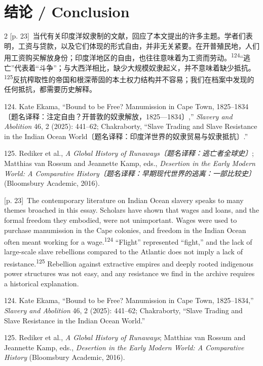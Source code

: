 \documentclass[10pt,a4paper]{article}
\begin{document}
\section*{结论 / Conclusion}
\begin{paracol}{2}
{\scriptsize\color{gray} [p. 23]}\ 当代有关印度洋奴隶制的文献，回应了本文提出的许多主题。学者们表明，工资与贷款，以及它们体现的形式自由，并非无关紧要。在开普殖民地，人们用工资购买解放身份；印度洋地区的自由，也往往意味着为工资而劳\mbox{动。\textsuperscript{124}}“逃亡”代表着“斗争”；与大西洋相比，缺少大规模奴隶起义，并不意味着缺少抵\mbox{抗。\textsuperscript{125}}反抗榨取性的帝国和根深蒂固的本土权力结构并不容易；我们在档案中发现的任何抵抗，都需要历史解释。\par{\small 124. Kate Ekama, “Bound to be Free? Manumission in Cape Town, 1825–1834〔题名译释：注定自由？开普敦的奴隶解放，1825—1834〕,” \textit{Slavery and Abolition} 46, 2 (2025): 441–62; Chakraborty, “Slave Trading and Slave Resistance in the Indian Ocean World〔题名译释：印度洋世界的奴隶贸易与奴隶抵抗〕.”\par}{\small 125. Rediker et al., \textit{A Global History of Runaways〔题名译释：逃亡者全球史〕}; Matthias van Rossum and Jeannette Kamp, eds., \textit{Desertion in the Early Modern World: A Comparative History〔题名译释：早期现代世界的逃离：一部比较史〕} (Bloomsbury Academic, 2016).\par}
\switchcolumn
{\scriptsize\color{gray} [p. 23]}\ The contemporary literature on Indian Ocean slavery speaks to many themes broached in this essay. Scholars have shown that wages and loans, and the formal freedom they embodied, were not unimportant. Wages were used to purchase manumission in the Cape colonies, and freedom in the Indian Ocean often meant working for a wage.\nobreak\textsuperscript{124} “Flight” represented “fight,” and the lack of large-scale slave rebellions compared to the Atlantic does not imply a lack of resistance.\nobreak\textsuperscript{125} Rebellion against extractive empires and deeply rooted indigenous power structures was not easy, and any resistance we find in the archive requires a historical explanation.\par{\small 124. Kate Ekama, “Bound to be Free? Manumission in Cape Town, 1825–1834,” \textit{Slavery and Abolition} 46, 2 (2025): 441–62; Chakraborty, “Slave Trading and Slave Resistance in the Indian Ocean World.”\par}{\small 125. Rediker et al., \textit{A Global History of Runaways}; Matthias van Rossum and Jeannette Kamp, eds., \textit{Desertion in the Early Modern World: A Comparative History} (Bloomsbury Academic, 2016).\par}

\end{paracol}
\end{document}
